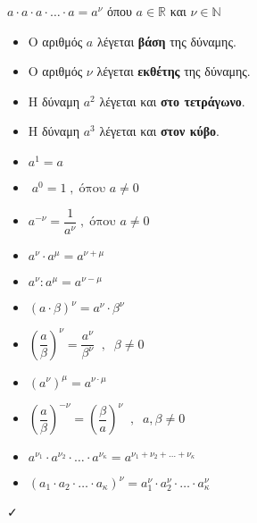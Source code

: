 \documentclass[11pt]{article}
\begin{document}
\newpage
$a\cdot a\cdot a\cdot\ldots\cdot a=a^{\nu}$ όπου $a\in\mathbb{R}$ και $\nu\in\mathbb{N}$
\begin{itemize}[itemsep=0mm]
\item Ο αριθμός $a$ λέγεται \textbf{βάση} της δύναμης.
\item Ο αριθμός $\nu$ λέγεται \textbf{εκθέτης} της δύναμης.
\item Η δύναμη $a^2$ λέγεται και \textbf{στο τετράγωνο}.
\item Η δύναμη $a^3$ λέγεται και \textbf{στον κύβο}.
\end{itemize}
\begin{itemize}[label*={\footnotesize \faPlay},itemsep=0mm]
\item $ a^1=a\;$
\item $\;a^0=1\;,\;\textrm{όπου }a\neq0$
\item $a^{-\nu}=\dfrac{1}{a^\nu}\;,\;\textrm{όπου }a\neq0$
\item $ a^\nu\cdot a^\mu=a^{\nu+\mu} $
\item $ a^\nu: a^\mu=a^{\nu-\mu} $
\item $ \left(a\cdot\beta\right)^\nu=a^\nu\cdot\beta^\nu $
\item $ \left(\dfrac{a}{\beta}\right)^\nu=\dfrac{a^\nu}{\beta^\nu}\;\;,\;\;\beta\neq0 $
\item $ \left( a^\nu\right)^\mu=a^{\nu\cdot\mu} $
\item $ \left( \dfrac{a}{\beta}\right)^{-\nu}=\left(\dfrac{\beta}{a}\right)^\nu\;\;,\;\;a,\beta\neq0 $ 
\item $
a^{\nu_1}\cdot a^{\nu_2}\cdot\ldots\cdot a^{\nu_\kappa}=a^{\nu_1+\nu_2+\ldots+\nu_\kappa}$
\item $ 
\left( a_1\cdot a_2\cdot\ldots\cdot a_\kappa\right)^\nu=a_1^\nu\cdot a_2^\nu\cdot\ldots\cdot a_\kappa^\nu $
\end{itemize}
\faCheck
\end{document}
